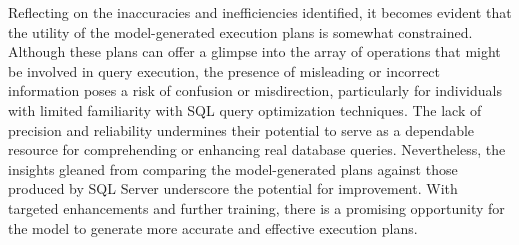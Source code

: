 Reflecting on the inaccuracies and inefficiencies identified, it becomes evident that the utility of the model-generated execution plans is somewhat constrained. Although these plans can offer a glimpse into the array of operations that might be involved in query execution, the presence of misleading or incorrect information poses a risk of confusion or misdirection, particularly for individuals with limited familiarity with SQL query optimization techniques. The lack of precision and reliability undermines their potential to serve as a dependable resource for comprehending or enhancing real database queries. Nevertheless, the insights gleaned from comparing the model-generated plans against those produced by SQL Server underscore the potential for improvement. With targeted enhancements and further training, there is a promising opportunity for the model to generate more accurate and effective execution plans.

